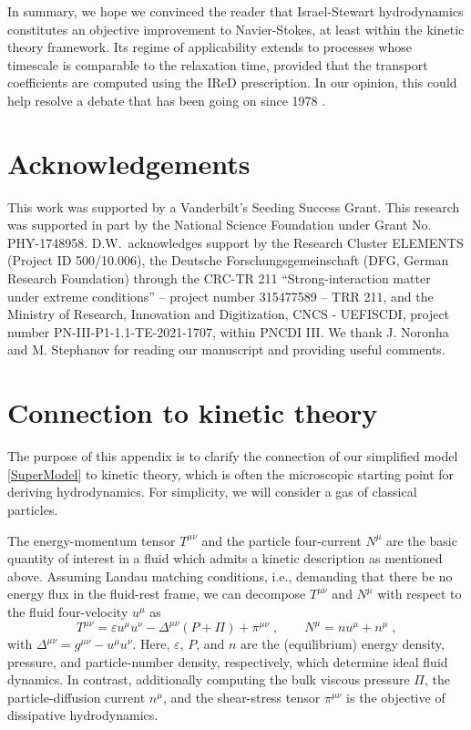 \documentclass[a4paper, amsfonts, amssymb, amsmath, reprint, showkeys, nofootinbib, twoside, onecolumn,notitlepage]{revtex4-2}
\begin{document}
In summary, we hope we convinced the reader that Israel-Stewart hydrodynamics constitutes an objective improvement to Navier-Stokes, at least within the kinetic theory framework. Its regime of applicability extends to processes whose timescale is comparable to the relaxation time, provided that the transport coefficients are computed using the IReD prescription. In our opinion, this could help resolve a debate that has been going on since 1978 \cite{Israel_Stewart_1979}.




\section*{Acknowledgements}

This work was supported by a Vanderbilt's Seeding Success Grant.  This research was supported in part by the National Science Foundation under Grant No. PHY-1748958. 
D.W.\ acknowledges support by the Research Cluster ELEMENTS (Project ID 500/10.006), the Deutsche
Forschungsgemeinschaft (DFG, German Research Foundation) through the 
CRC-TR 211 ``Strong-interaction matter
under extreme conditions'' -- project number 315477589 -- TRR 211, and the 
Ministry of Research, Innovation and Digitization, CNCS - UEFISCDI,
project number PN-III-P1-1.1-TE-2021-1707, within PNCDI III. We thank J. Noronha and M. Stephanov for reading our manuscript and providing useful comments.


\appendix

\section{Connection to kinetic theory}
\label{app:kin_theory}
The purpose of this appendix is to clarify the connection of our simplified model \eqref{SuperModel} to kinetic theory, which is often the microscopic starting point for deriving hydrodynamics. For simplicity, we will consider a gas of classical particles.

The energy-momentum tensor $T^{\mu\nu}$ and the particle four-current $N^\mu$ are the basic quantity of interest in a fluid which admits a kinetic description as mentioned above.
Assuming Landau matching conditions, i.e., demanding that there be no energy flux in the fluid-rest frame, we can decompose $T^{\mu\nu}$ and $N^\mu$ with respect to the fluid four-velocity $u^\mu$ as
\begin{equation}
    T^{\mu\nu}=\varepsilon u^\mu u^\nu - \Delta^{\mu\nu} \left(P+\Pi\right) +\pi^{\mu\nu}\;,\qquad N^\mu = n u^\mu + n^\mu \;,
\end{equation}
with $\Delta^{\mu\nu}=g^{\mu\nu}-u^\mu u^\nu$.
Here, $\varepsilon$, $P$, and $n$ are the (equilibrium) energy density, pressure, and particle-number density, respectively, which determine ideal fluid dynamics. In contrast, additionally computing the bulk viscous pressure $\Pi$, the particle-diffusion current $n^\mu$, and the shear-stress tensor $\pi^{\mu\nu}$ is the objective of dissipative hydrodynamics. 
\end{document}
